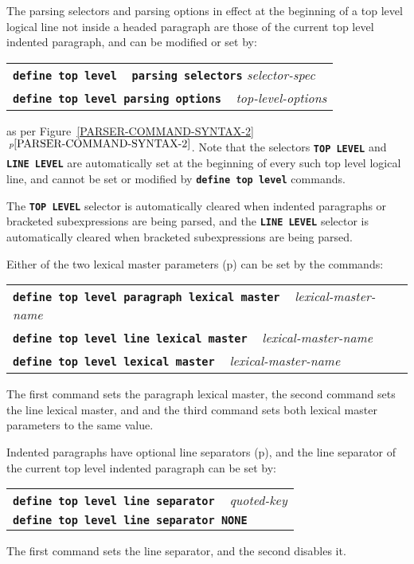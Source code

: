 \documentclass[12pt]{article}
\makeatletter
\newcommand{\TT}[1]{{\tt \bfseries #1}}
\newcommand{\ttmkey}[2]{\TT{#1}\index{#1@\TT{#1}!#2}}
\newcommand{\itemref}[1]{\ref{#1}$\,^{p\pageref{#1}}$}
\newcommand{\pagref}[1]{p\pageref{#1}}
\makeatother
\begin{document}
The parsing selectors and parsing options
in effect at the beginning of a top level logical line not inside
a headed paragraph are those of the
current top level indented paragraph, and can be modified or set by:
\begin{center}
    \begin{tabular}[t]{l}
    \ttmkey{define top level}{parser command} ~
    \TT{parsing selectors} {\em selector-spec} \\
    \TT{define top level parsing options} ~ {\em top-level-options} \\
    \end{tabular}
\end{center}
as per Figure~\itemref{PARSER-COMMAND-SYNTAX-2}.
Note that the selectors \TT{TOP LEVEL}\label{TOP-LEVEL-SELECTOR}
and \TT{LINE LEVEL} are automatically set at the beginning of
every such top level logical line, and cannot be set or modified
by \TT{define top level} commands.

The \TT{TOP LEVEL} selector is automatically cleared
when indented paragraphs or bracketed subexpressions are being parsed,
and the \TT{LINE LEVEL} selector is automatically cleared when
bracketed subexpressions are being parsed.

Either of the two lexical master parameters (\pagref{LEXICAL-MASTER-PARAMETERS})
can be set by the commands:
\begin{center}
    \begin{tabular}[t]{l}
    \TT{define top level paragraph lexical master} ~
        {\em lexical-master-name} \\
    \TT{define top level line lexical master} ~
        {\em lexical-master-name} \\
    \TT{define top level lexical master} ~
        {\em lexical-master-name} \\
    \end{tabular}
\end{center}
The first command sets the paragraph lexical master,
the second command sets the line lexical master, and
and the third command
sets both lexical master parameters to the same value.

Indented paragraphs have optional line separators (\pagref{LINE-SEPARATOR}),
and the line separator of the current top level indented paragraph can be
set by:
\begin{center}
    \begin{tabular}[t]{l}
    \ttmkey{define top level line separator}{parser command} ~
           {\em quoted-key} \\
    \TT{define top level line separator NONE} \\
    \end{tabular}
\end{center}
The first command sets the line separator, and the second disables
it.
\end{document}
